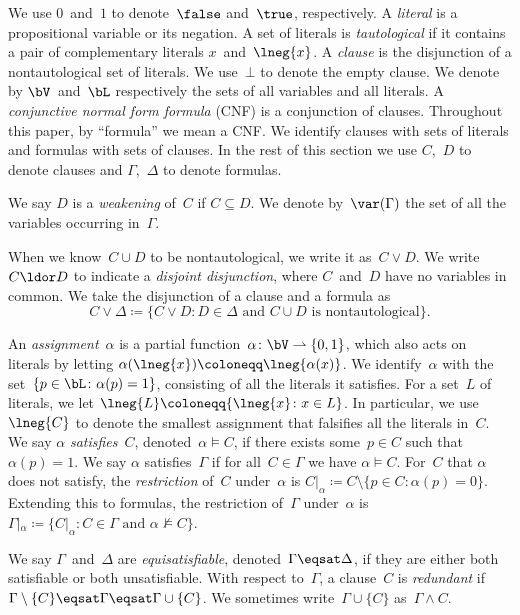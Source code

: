 \documentclass[10pt,a4paper]{article}
\begin{document}
We use $0$~and~$1$ to denote~$\false$ and~$\true$, respectively.
A \emph{literal} is a propositional variable or its negation.
A set of literals is \emph{tautological}
if it contains a pair of complementary literals $x$~and~$\lneg{x}$.
A \emph{clause} is the disjunction of a nontautological set of literals.
We use~$\bot$ to denote the empty clause.
We denote by $\bV$~and~$\bL$ respectively
the sets of all variables and all literals.
A \emph{conjunctive normal form formula} (CNF) is a conjunction of clauses.
Throughout this paper, by ``formula'' we mean a CNF\@.
We identify clauses with sets of literals and formulas with sets of clauses.
In the rest of this section we use $C$,~$D$ to denote clauses
and $\Gamma$,~$\Delta$ to denote formulas.

We say $D$ is a \emph{weakening} of~$C$ if $C \subseteq D$.
We denote by~$\var(\Gamma)$ the set of all the variables occurring in~$\Gamma$.

When we know~$C \cup D$ to be nontautological, we write it as~$C \lor D$.
We write~$C \ldor D$ to indicate a \emph{disjoint disjunction},
where $C$~and~$D$ have no variables in common.
We take the disjunction of a clause and a formula as
\begin{equation*}
  C \lor \Delta \coloneqq \{C \lor D \colon
  D \in \Delta \text{ and } C \cup D \text{ is nontautological}\}.
\end{equation*}

An \emph{assignment}~$\alpha$
is a partial function~$\alpha \colon \bV \rightharpoonup \{0,1\}$,
which also acts on literals by letting $\alpha(\lneg{x}) \coloneqq \lneg{\alpha(x)}$.
We identify~$\alpha$ with the set~$\{p \in \bL \colon \alpha(p) = 1\}$,
consisting of all the literals it satisfies.
For a set~$L$ of literals, we let $\lneg{L} \coloneqq \{\lneg{x} \colon x \in L\}$.
In particular, we use~$\lneg{C}$ to denote the smallest assignment
that falsifies all the literals in~$C$.
We say $\alpha$ \emph{satisfies}~$C$, denoted~$\alpha \models C$,
if there exists some~$p \in C$ such that $\alpha(p) = 1$.
We say $\alpha$ satisfies~$\Gamma$ if for all~$C \in \Gamma$ we have $\alpha \models C$.
For~$C$ that $\alpha$ does not satisfy,
the \emph{restriction} of~$C$ under~$\alpha$ is
$C|_\alpha \coloneqq C \setminus \{p \in C \colon \alpha(p) = 0\}$.
Extending this to formulas, the restriction of~$\Gamma$ under~$\alpha$ is
$\Gamma|_\alpha \coloneqq \{C|_\alpha
\colon C \in \Gamma \text{ and } \alpha \not\models C\}$.

We say $\Gamma$~and~$\Delta$ are \emph{equisatisfiable}, denoted~$\Gamma \eqsat \Delta$,
if they are either both satisfiable or both unsatisfiable.
With respect to~$\Gamma$, a clause~$C$ is \emph{redundant}
if $\Gamma \setminus \{C\} \eqsat \Gamma \eqsat \Gamma \cup \{C\}$.
We sometimes write~$\Gamma \cup \{C\}$ as~$\Gamma \land C$.
\end{document}
